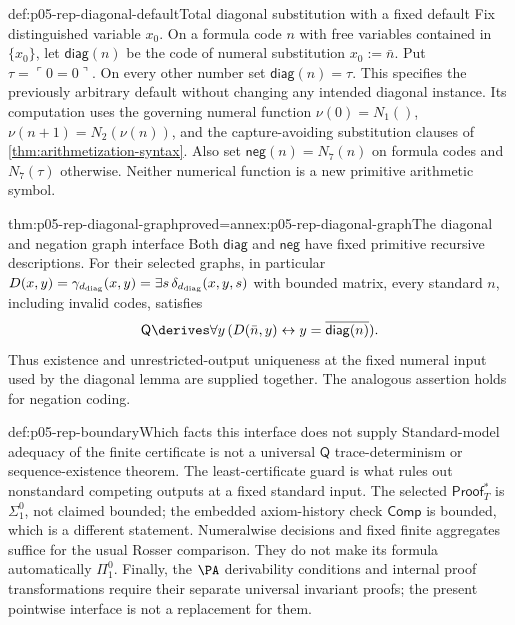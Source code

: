 \begin{hbdefinition}{def:p05-rep-diagonal-default}{Total diagonal substitution with a fixed default}
Fix distinguished variable \(x_0\). On a formula code \(n\) with free
variables contained in \(\{x_0\}\), let \(\mathsf{diag}(n)\) be the
code of numeral substitution \(x_0:=\bar n\). Put
\(\tau=\ulcorner0=0\urcorner\). On every other number set
\(\mathsf{diag}(n)=\tau\). This specifies the previously arbitrary default
without changing any intended diagonal instance. Its computation uses the
governing numeral function \(\nu(0)=N_1()\),
\(\nu(n+1)=N_2(\nu(n))\), and the capture-avoiding substitution clauses
of \cref{thm:arithmetization-syntax}. Also set
\(\mathsf{neg}(n)=N_7(n)\) on formula codes and \(N_7(\tau)\) otherwise.
Neither numerical function is a new primitive arithmetic symbol.
\end{hbdefinition}

\begin{hbcorollary}{thm:p05-rep-diagonal-graph}{proved=annex:p05-rep-diagonal-graph}{The diagonal and negation graph interface}
Both \(\mathsf{diag}\) and \(\mathsf{neg}\) have fixed primitive recursive
descriptions. For their selected graphs, in particular
\(D(x,y)=\gamma_{d_{\rm diag}}(x,y)=\exists s\,
\delta_{d_{\rm diag}}(x,y,s)\) with bounded matrix, every standard
\(n\), including invalid codes, satisfies
\[
 \mathsf Q\derives\forall y\,
      (D(\bar n,y)\leftrightarrow
                              y=\overline{\mathsf{diag}(n)}).
\]
Thus existence and unrestricted-output uniqueness at the fixed numeral
input used by the diagonal lemma are supplied together. The analogous
assertion holds for negation coding.
\end{hbcorollary}

\begin{hbwarning}{def:p05-rep-boundary}{Which facts this interface does not supply}
Standard-model adequacy of the finite certificate is not a universal
\(\mathsf Q\) trace-determinism or sequence-existence theorem. The
least-certificate guard is what rules out nonstandard competing outputs
at a fixed standard input. The selected \(\mathsf{Proof}^{*}_T\) is
\(\Sigma^0_1\), not claimed bounded; the embedded axiom-history check
\(\mathsf{Comp}\) is bounded, which is a different statement.
Numeralwise decisions and fixed finite aggregates suffice for the usual
Rosser comparison. They do not make its formula automatically
\(\Pi^0_1\). Finally, the \(\PA\) derivability conditions and internal
proof transformations require their separate universal invariant proofs;
the present pointwise interface is not a replacement for them.
\end{hbwarning}

